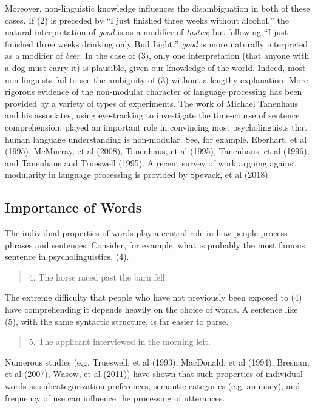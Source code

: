 \documentclass[a4paper]{article}
\begin{document}
\newline
Moreover, non-linguistic knowledge influences the disambiguation in both of these cases.  If (2) is preceded by ``I just finished three weeks without alcohol,'' the natural interpretation of {\it good} is as a modifier of {\it tastes}; but following ``I just finished three weeks drinking only Bud Light,'' {\it good} is more naturally interpreted as a modifier of {\it beer}.  In the case of (3), only one interpretation (that anyone with a dog must carry it) is plausible, given our knowledge of the world.  Indeed, most non-linguists fail to see the ambiguity of (3) without a lengthy explanation.  
\newline
\newline
More rigorous evidence of the non-modular character of language processing has been provided by a variety of types of experiments.  The work of Michael Tanenhaus and his associates, using eye-tracking to investigate the time-course of sentence comprehension, played an important role in convincing most psycholinguists that human language understanding is non-modular.  See, for example, Eberhart, et al (1995), McMurray, et al (2008), Tanenhaus, et al (1995), Tanenhaus, et al (1996), and Tanenhaus and Trueswell (1995). A recent survey of work arguing against modularity in language processing is provided by Spevack, et al (2018).  

\subsection{Importance of Words}

The individual properties of words play a central role in how people process phrases and sentences.  Consider, for example, what is probably the most famous sentence in psycholinguistics, (4).
\begin{quote}
4. The horse raced past the barn fell.
\end{quote}
The extreme difficulty that people who have not previously been exposed to (4) have comprehending it depends heavily on the choice of words.  A sentence like (5), with the same syntactic structure, is far easier to parse.
\begin{quote}
5. The applicant interviewed in the morning left.
\end{quote}  
Numerous studies (e.g. Trueswell, et al (1993), MacDonald, et al (1994), Bresnan, et al (2007), Wasow, et al (2011))  have shown that such properties of individual words as subcategorization preferences, semantic categories (e.g. animacy), and frequency of use can influence the processing of utterances.  
\end{document}
